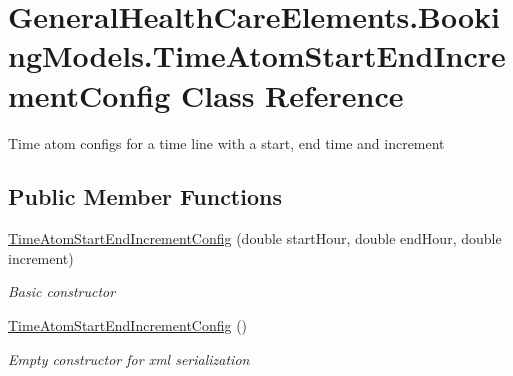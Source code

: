 \hypertarget{class_general_health_care_elements_1_1_booking_models_1_1_time_atom_start_end_increment_config}{}\section{General\+Health\+Care\+Elements.\+Booking\+Models.\+Time\+Atom\+Start\+End\+Increment\+Config Class Reference}
\label{class_general_health_care_elements_1_1_booking_models_1_1_time_atom_start_end_increment_config}


Time atom configs for a time line with a start, end time and increment  


\subsection*{Public Member Functions}
\begin{DoxyCompactItemize}
\item 
\hyperlink{class_general_health_care_elements_1_1_booking_models_1_1_time_atom_start_end_increment_config_af5182fddc043436ed2a501b7bf9a0c8f}{Time\+Atom\+Start\+End\+Increment\+Config} (double start\+Hour, double end\+Hour, double increment)
\begin{DoxyCompactList}\small\item\em Basic constructor \end{DoxyCompactList}\item 
\hyperlink{class_general_health_care_elements_1_1_booking_models_1_1_time_atom_start_end_increment_config_a52a50337dd5cd4d756e4410e01f08ba5}{Time\+Atom\+Start\+End\+Increment\+Config} ()
\begin{DoxyCompactList}\small\item\em Empty constructor for xml serialization \end{DoxyCompactList}\end{DoxyCompactItemize}
